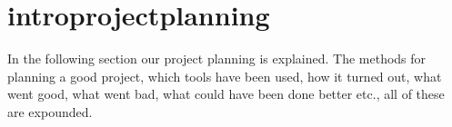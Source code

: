 \section{introprojectplanning}
In the following section our project planning is explained. The methods for planning a good project, which tools have been used, how it turned out, what went good, what went bad, what could have been done better etc., all of these are expounded.